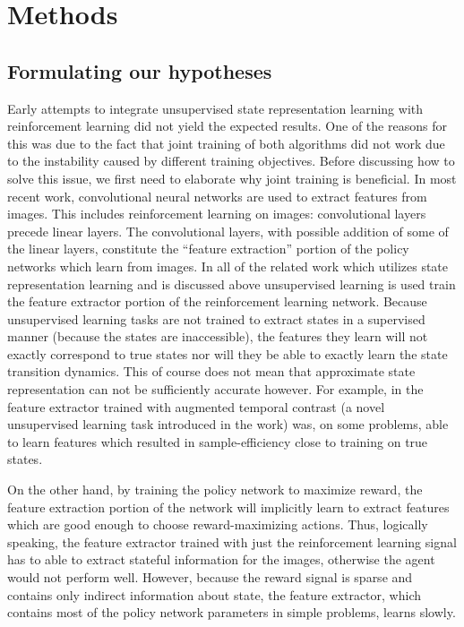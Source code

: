 \chapter{Methods}
\section{Formulating our hypotheses}
\label{sec-hypothesis-reasoning}
Early attempts to integrate unsupervised state representation learning with reinforcement learning
did not yield the expected results.
One of the reasons for this was due to the fact that joint training of both algorithms 
did not work due to the instability caused by different training objectives.
Before discussing how to solve this issue, we first need to elaborate why joint training
is beneficial.
In most recent work, convolutional neural networks are used to extract features from images.
This includes reinforcement learning on images: convolutional layers precede linear layers.
The convolutional layers, with possible addition of some of the linear layers,
constitute the ``feature extraction'' portion of the policy networks
which learn from images.
In all of the related work which utilizes state representation learning and is discussed above
unsupervised learning is used train the feature extractor portion of the reinforcement learning network.
Because unsupervised learning tasks are not trained to extract states in a supervised manner (because the states
are inaccessible),
the features they learn will not exactly correspond to true states nor will they be able to
exactly learn the state transition dynamics.
This of course does not mean that approximate state representation can not be sufficiently accurate however.
For example, in \cite{stooke2021decoupling} the feature extractor trained with augmented temporal
contrast (a novel unsupervised learning task introduced in the work)
was, on some problems, able to learn features which resulted in sample-efficiency
close to training on true states.

On the other hand, by training the policy network to maximize reward, the feature extraction 
portion of the network will implicitly learn to extract features which are good enough
to choose reward-maximizing actions.
Thus, logically speaking, the feature extractor trained with just the reinforcement learning signal
has to able to extract stateful information for the images, otherwise the agent would not perform well.
However, because the reward signal is sparse and contains only indirect information about state,
the feature extractor, which contains most of the policy network parameters in simple problems,
learns slowly.

